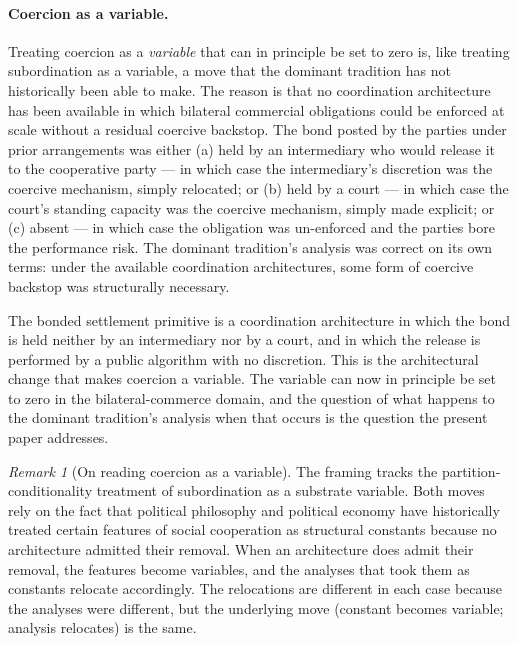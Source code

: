 \documentclass[11pt,a4paper]{article}
\theoremstyle{remark}
\newtheorem{remark}{Remark}[section]
\begin{document}
\paragraph{Coercion as a variable.}
Treating coercion as a \emph{variable} that can in principle be
set to zero is, like treating subordination as a variable, a move
that the dominant tradition has not historically been able to
make. The reason is that no coordination architecture has been
available in which bilateral commercial obligations could be
enforced at scale without a residual coercive backstop. The bond
posted by the parties under prior arrangements was either (a)
held by an intermediary who would release it to the cooperative
party --- in which case the intermediary's discretion was the
coercive mechanism, simply relocated; or (b) held by a court ---
in which case the court's standing capacity was the coercive
mechanism, simply made explicit; or (c) absent --- in which case
the obligation was un-enforced and the parties bore the
performance risk. The dominant tradition's analysis was correct
on its own terms: under the available coordination architectures,
some form of coercive backstop was structurally necessary.

The bonded settlement primitive is a coordination architecture
in which the bond is held neither by an intermediary nor by a
court, and in which the release is performed by a public
algorithm with no discretion. This is the architectural change
that makes coercion a variable. The variable can now in
principle be set to zero in the bilateral-commerce domain, and
the question of what happens to the dominant tradition's
analysis when that occurs is the question the present paper
addresses.

\begin{remark}[On reading coercion as a variable]
The framing tracks the partition-conditionality treatment of
subordination as a substrate variable. Both moves rely on
the fact that political philosophy and political economy have
historically treated certain features of social cooperation as
structural constants because no architecture admitted their
removal. When an architecture does admit their removal, the
features become variables, and the analyses that took them as
constants relocate accordingly. The relocations are different
in each case because the analyses were different, but the
underlying move (constant becomes variable; analysis relocates)
is the same.
\end{remark}

\end{document}
